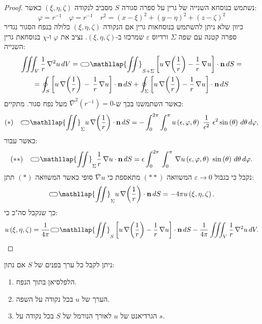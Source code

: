 \documentclass{tstextbook}
\begin{document}
\begin{proof}
נשתמש בנוסחא השנייה של גרין על ספרה סגורה \(S\) מסביב לנקודה \((\xi,\eta,\zeta)\) כאשר:
$$\varphi=r^{-1} \quad \varphi=r^{-1}\quad r^{2}=\left( x{-}\xi \right)^{2}{+}\left( y{-}\eta \right)^{2}{+}\left( z{-}\zeta \right)^{2}$$
כיוון שלא ניתן להשתמש בנוסחאות גרין אם הנקודה \(\left( \xi,\eta,\zeta \right)\) כלולה בנפח הסגור נגדיר ספרה קטנה עם שפה \(\Sigma\) ורדיוס \(\varepsilon\) שמרכזו ב-\((\xi,\eta,\zeta)\). נציב את \(\varphi\) ו-\(\chi\) בנוסחאת גרין השנייה:
$$\begin{gather}\iiint_{V}{\frac{1}{r}}\,\nabla^{2}u\,d V={\subset\!\supset} \mathllap{\iint}_{S+\Sigma}\left[u\,\nabla\!\left({\frac{1}{r}}\right)-{\frac{1}{r}}\,\nabla u\right]\cdot\mathbf{n}\,d S=\\=\oint_{S}\left[u\,\nabla\!\left({\frac{1}{r}}\right)\,-\,{\frac{1}{r}}\,\nabla u\right]\cdot\mathbf{n}\,d S+\oint_{\Sigma}\left[u\,\nabla\!\left({\frac{1}{r}}\right)-{\frac{1}{r}}\,\nabla u\right]\cdot\mathbf{n}\,d S 
\end{gather}$$
כאשר השתמשנו בכך ש-\(\bar{\nabla}^2(r^{-1})=0\) מעל נפח סגור. מתקיים:
$$(*)\quad {\subset\!\supset} \mathllap{\iint}_{\Sigma}u\,\nabla\!\left({\frac{1}{r}}\right)\cdot\mathbf{n}\,d S=-\int_{0}^{2\pi}\int_{0}^{\pi}u\left( \epsilon,\varphi,\theta \right)\,\,{\frac{1}{\epsilon^{2}}}\,\,\epsilon^{2}\sin\left( \theta \right)\,d\theta\,d\varphi,$$
כאשר עבור:
$$(* *)\quad {\subset\!\supset} \mathllap{\iint}_{\Sigma}{\frac{1}{r}}\,\nabla u\cdot\mathbf{n}\,d S=\epsilon\int_{0}^{2\pi}\,\int_{0}^{\pi}\,\nabla u\left( \epsilon,\varphi,\theta \right)\ \sin\left( \theta \right)\,d\theta\,d\varphi.$$
נקבל כי בגבול \(\varepsilon\to 0\) המשוואה \((* *)\) מתאספת כי \(\bar{\nabla}u\) סופי כאשר המשוואה \((*)\) תתן:
$${\subset\!\supset} \mathllap{\iint}_{\Sigma}u\,\nabla\!\left({\frac{1}{r}}\right)\cdot\mathbf{n}\,d S=-4\pi u\left( \xi,\eta,\zeta \right).$$
כך שנקבל סה"כ כי:
$$u\left( \xi,\eta,\zeta \right)={\frac{1}{4\pi}}{\subset\!\supset} \mathllap{\iint}_{S}\left[u\,\nabla\!\left({\frac{1}{r}}\right)-{\frac{1}{r}}\,\nabla u\right]\cdot\mathbf{n}\,d S-{\frac{1}{4\pi}}\iiint_{V}{\frac{1}{r}}\,\nabla^{2}u\,d V.$$

\end{proof}
\begin{corollary}
ניתן לקבל כל ערך בפנים של \(S\) אם נתון:

  \begin{enumerate}
    \item הלפלסיאן בתוך הנפח. 


    \item הערך של \(u\) בכל נקודה על השפה. 


    \item הגרדיאנט של \(u\) לאורך הנורמל של \(S\) בכל נקודה על \(s\). 


  \end{enumerate}
\end{corollary}
\end{document}
